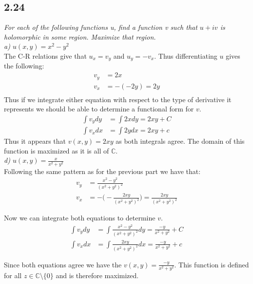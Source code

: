 \documentclass[a4paper, 11pt]{article}
\begin{document}
\subsection*{2.24}
	\textit{For each of the following functions u, find a function v such that $u+iv$ is holomorphic in some region. Maximize that region.}\\ 
	
	\noindent\textit{a) $u(x,y)= x^2-y^2$} \\ 
	
	\noindent The C-R relations give that $u_x=v_y$ and $u_y = -v_x$. Thus differentiating $u$ gives the following: 
		\begin{align*}
			v_y &= 2x \\ 
			v_x &= -(-2y) = 2y \\ 
		\end{align*}
	\noindent Thus if we integrate either equation with respect to the type of derivative it represents we should be able to determine a functional form for $v$. 
		\begin{align*}
			\int v_y dy &= \int 2x dy = 2xy + C \\ 
			\int v_x dx &= \int 2y dx = 2xy + c 
		\end{align*}
	\noindent Thus it appears that $v(x,y) = 2xy$ as both integrals agree. The domain of this function is maximized as it is all of $\mathbb{C}$. \\
	
	\noindent \textit{d) $u(x,y) = \frac{x}{x^2+y^2}$}\\ 
	
	\noindent Following the same pattern as for the previous part we have that:
		\begin{align*}
			v_y &= \frac{x^2-y^2}{(x^2+y^2)^2} \\ 
			v_x &= -\Big(-\frac{2xy}{(x^2+y^2)^2}\Big) = \frac{2xy}{(x^2+y^2)^2} 
		\end{align*}	
	
	\noindent Now we can integrate both equations to determine $v$. 
		\begin{align*}
			\int v_y dy &= \int \frac{x^2-y^2}{(x^2+y^2)^2} dy = \frac{-y}{x^2+y^2}+C\\ 
			\int v_x dx &= \int \frac{2xy}{(x^2+y^2)^2} dx = \frac{-y}{x^2+y^2} + c 
		\end{align*}
	
	\noindent Since both equations agree we have the $v(x,y) = \frac{-y}{x^2+y^2}$. This function is defined for all $z\in \mathbb{C}\setminus\{0\}$ and is therefore maximized. 
		
\end{document}

